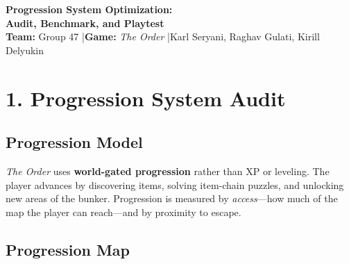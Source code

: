 \documentclass[11pt]{article}
\begin{document}
\begin{center}
{\LARGE \textbf{Progression System Optimization:}\\[4pt]\textbf{Audit, Benchmark, and Playtest}}\\[12pt]
\textbf{Team:} Group 47 \quad|\quad \textbf{Game:} \textit{The Order} \quad|\quad Karl Seryani, Raghav Gulati, Kirill Delyukin
\end{center}

\vspace{0.5cm}

\section{1. Progression System Audit}

\subsection{Progression Model}

\textit{The Order} uses \textbf{world-gated progression} rather than XP or leveling. The player advances by discovering items, solving item-chain puzzles, and unlocking new areas of the bunker. Progression is measured by \textit{access}---how much of the map the player can reach---and by proximity to escape.

\subsection{Progression Map}
\end{document}
